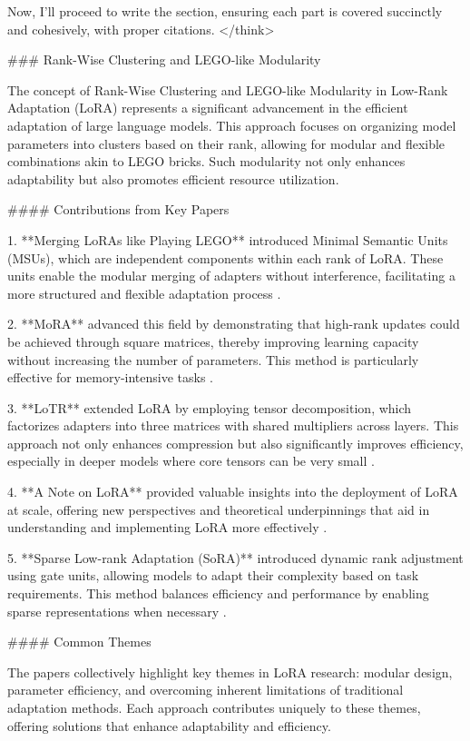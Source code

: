 \documentclass[conference]{IEEEtran}
\begin{document}
Now, I'll proceed to write the section, ensuring each part is covered succinctly and cohesively, with proper citations.
</think>

### Rank-Wise Clustering and LEGO-like Modularity

The concept of Rank-Wise Clustering and LEGO-like Modularity in Low-Rank Adaptation (LoRA) represents a significant advancement in the efficient adaptation of large language models. This approach focuses on organizing model parameters into clusters based on their rank, allowing for modular and flexible combinations akin to LEGO bricks. Such modularity not only enhances adaptability but also promotes efficient resource utilization.

#### Contributions from Key Papers

1. **Merging LoRAs like Playing LEGO** introduced Minimal Semantic Units (MSUs), which are independent components within each rank of LoRA. These units enable the modular merging of adapters without interference, facilitating a more structured and flexible adaptation process \cite{bX}.

2. **MoRA** advanced this field by demonstrating that high-rank updates could be achieved through square matrices, thereby improving learning capacity without increasing the number of parameters. This method is particularly effective for memory-intensive tasks \cite{bY}.

3. **LoTR** extended LoRA by employing tensor decomposition, which factorizes adapters into three matrices with shared multipliers across layers. This approach not only enhances compression but also significantly improves efficiency, especially in deeper models where core tensors can be very small \cite{bZ}.

4. **A Note on LoRA** provided valuable insights into the deployment of LoRA at scale, offering new perspectives and theoretical underpinnings that aid in understanding and implementing LoRA more effectively \cite{bW}.

5. **Sparse Low-rank Adaptation (SoRA)** introduced dynamic rank adjustment using gate units, allowing models to adapt their complexity based on task requirements. This method balances efficiency and performance by enabling sparse representations when necessary \cite{bV}.

#### Common Themes

The papers collectively highlight key themes in LoRA research: modular design, parameter efficiency, and overcoming inherent limitations of traditional adaptation methods. Each approach contributes uniquely to these themes, offering solutions that enhance adaptability and efficiency.
\end{document}

